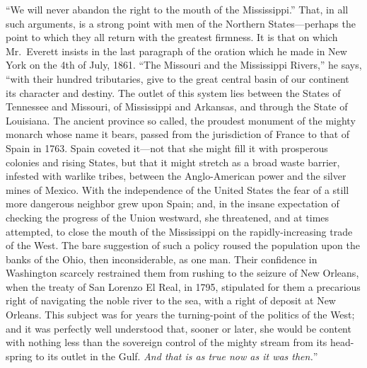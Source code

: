 ``We will never abandon the right to the mouth of the Mississippi.''
That, in all such arguments, is a strong point with men of the
Northern States---perhaps the point to which they all return with
the greatest firmness.  It is that on which Mr.\ Everett insists in
the last paragraph of the oration which he made in New York on the
4th of July, 1861.  ``The Missouri and the Mississippi Rivers,'' he
says, ``with their hundred tributaries, give to the great central
basin of our continent its character and destiny.  The outlet of
this system lies between the States of Tennessee and Missouri, of
Mississippi and Arkansas, and through the State of Louisiana.  The
ancient province so called, the proudest monument of the mighty
monarch whose name it bears, passed from the jurisdiction of France
to that of Spain in 1763.  Spain coveted it---not that she might
fill it with prosperous colonies and rising States, but that it
might stretch as a broad waste barrier, infested with warlike
tribes, between the Anglo-American power and the silver mines of
Mexico.  With the independence of the United States the fear of a
still more dangerous neighbor grew upon Spain; and, in the insane
expectation of checking the progress of the Union westward, she
threatened, and at times attempted, to close the mouth of the
Mississippi on the rapidly-increasing trade of the West.  The bare
suggestion of such a policy roused the population upon the banks of
the Ohio, then inconsiderable, as one man.  Their confidence in
Washington scarcely restrained them from rushing to the seizure of
New Orleans, when the treaty of San Lorenzo El Real, in 1795,
stipulated for them a precarious right of navigating the noble
river to the sea, with a right of deposit at New Orleans.  This
subject was for years the turning-point of the politics of the
West; and it was perfectly well understood that, sooner or later,
she would be content with nothing less than the sovereign control
of the mighty stream from its head-spring to its outlet in the
Gulf.  \emph{And that is as true now as it was then.}''

